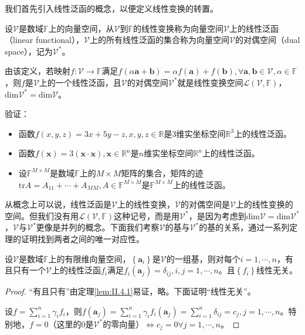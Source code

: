 \documentclass[main.tex]{subfiles}
\begin{document}
我们首先引入线性泛函的概念，以便定义线性变换的转置。

\begin{definition}[线性泛函与对偶空间]\label{def:II.4.4}
设$\mathcal{V}$是数域$\mathbb{F}$上的向量空间，从$\mathcal{V}$到$\mathbb{F}$的线性变换称为向量空间$\mathcal{V}$上的线性泛函（linear functional），$\mathcal{V}$上的所有线性泛函的集合称为向量空间$\mathcal{V}$的对偶空间（dual space），记为$\mathcal{V}^*$。
\end{definition}

由该定义，若映射$f:\mathcal{V}\rightarrow\mathbb{F}$满足$f\left(\alpha\mathbf{a}+\mathbf{b}\right)=\alpha f\left(\mathbf{a}\right)+f\left(\mathbf{b}\right),\forall\mathbf{a},\mathbf{b}\in\mathcal{V},\alpha\in\mathbb{F}$，则$f$是$\mathcal{V}$上的一个线性泛函，且$\mathcal{V}$的对偶空间$\mathcal{V}^*$就是线性变换空间$\mathcal{L}\left(\mathcal{V},\mathbb{F}\right)$，$\mathrm{dim}\mathcal{V}^*=\mathrm{dim}\mathcal{V}$。

\begin{example}
验证：
\begin{itemize}
    \item 函数$f\left(x,y,z\right)=3x+5y-z,x,y,z\in\mathbb{R}$是3维实坐标空间$\mathbb{R}^3$上的线性泛函。
    \item 函数$f\left(\mathbf{x}\right)=3\left(\mathbf{x}\cdot\mathbf{x}\right),\mathbf{x}\in\mathbb{R}^n$是$n$维实坐标空间$\mathbb{R}^n$上的线性泛函。
    \item 设$\mathbb{F}^{M\times M}$是数域$\mathbb{F}$上的$M\times M$矩阵的集合，矩阵的迹$\mathrm{tr}A=A_{11}+\cdots+A_{MM},A\in\mathbb{F}^{M\times M}$是$\mathbb{F}^{M\times M}$上的线性泛函。
\end{itemize}
\end{example}

从概念上可以说，线性泛函是$\mathcal{V}$上的线性变换，$\mathcal{V}$的对偶空间是$\mathcal{V}$上的线性变换的空间。但我们没有用$\mathcal{L}\left(\mathcal{V},\mathbb{F}\right)$这种记号，而是用$\mathcal{V}^*$，是因为考虑到$\mathrm{dim}\mathcal{V}=\mathrm{dim}\mathcal{V}^*$，$\mathcal{V}$与$\mathcal{V}^*$更像是并列的概念。下面我们考察$\mathcal{V}$的基与$\mathcal{V}^*$的基的关系，通过一系列定理的证明找到两者之间的唯一对应性。

\begin{theorem}\label{thm:II.4.13}
设$\mathcal{V}$是数域$\mathbb{F}$上的有限维向量空间，$\left\{\mathbf{a}_i\right\}$是$\mathcal{V}$的一组基，则对每个$i=1,\cdots,n$，有且只有一个$\mathcal{V}$上的线性泛函$f_i$满足$f_i\left(\mathbf{a}_j\right)=\delta_{ij},i,j=1,\cdots,n$。且$\left\{f_i\right\}$线性无关。
\end{theorem}
\begin{proof}
“有且只有”由定理\ref{lem:II.4.1}易证，略。下面证明“线性无关”。

设$f=\sum_{i=1}^n\gamma_if_i$，则$f\left(\mathbf{a}_j\right)=\sum_{i=1}^n\gamma_if_i\left(\mathbf{a}_j\right)=\sum_{i=1}^n\delta_{ij}=c_j,j=1,\cdots,n$。特别地，$f=0$（这里的$0$是$\mathcal{V}^*$的零向量）$\Leftrightarrow c_j=0\forall j=1,\cdots,n$。
\end{proof}
\end{document}
